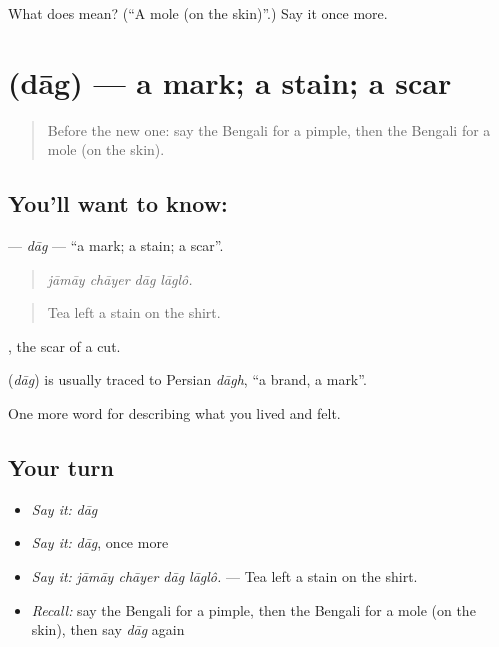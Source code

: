 \begin{tcolorbox}[breakable,colback=teal!4,colframe=teal!35!black,title={Before you move on}]
What does  mean? (\textquotedblleft{}A mole (on the skin)\textquotedblright{}.) Say it once more.
\end{tcolorbox}
\section[\texorpdfstring{\bn{দাগ} (dāg)}{দাগ (dāg)}]{ (dāg) — a mark; a stain; a scar}

\label{lesson:BN-C469-dag}



\begin{quote}
Before the new one: say the Bengali for a pimple, then the Bengali for a mole (on the skin).
\end{quote}

\subsection*{You'll want to know: }
\textbf{} — \emph{dāg} — \textquotedblleft{}a mark; a stain; a scar\textquotedblright{}.

\begin{quote}
   
\end{quote}

\begin{quote}
\emph{jāmāy chāyer dāg lāglô.}
\end{quote}

\begin{quote}
Tea left a stain on the shirt.
\end{quote}

 , the scar of a cut.

\begin{cousinweb}
\textbf{} (\emph{dāg}) is usually traced to Persian \emph{dāgh}, \textquotedblleft{}a brand, a mark\textquotedblright{}.
\end{cousinweb}

\begin{grammarlens}[title={What you've built}]
One more word for describing what you lived and felt.
\end{grammarlens}

\subsection*{Your turn}
\begin{itemize}
\raggedright
  \item \emph{Say it:} \emph{dāg}
  \item \emph{Say it:} \emph{dāg}, once more
  \item \emph{Say it:} \emph{jāmāy chāyer dāg lāglô.} — Tea left a stain on the shirt.
  \item \emph{Recall:} say the Bengali for a pimple, then the Bengali for a mole (on the skin), then say \emph{dāg} again
\end{itemize}

